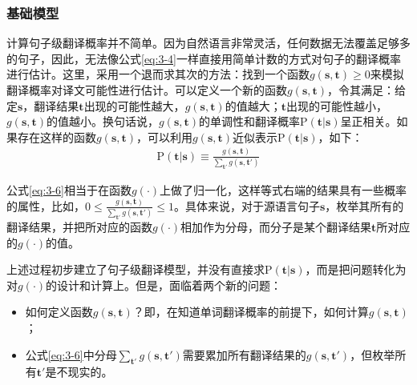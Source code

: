 
\subsubsection{基础模型}

\parinterval 计算句子级翻译概率并不简单。因为自然语言非常灵活，任何数据无法覆盖足够多的句子，因此，无法像公式\ref{eq:3-4}一样直接用简单计数的方式对句子的翻译概率进行估计。这里，采用一个退而求其次的方法：找到一个函数$g(\mathbf{s},\mathbf{t})\ge 0$来模拟翻译概率对译文可能性进行估计。可以定义一个新的函数$g(\mathbf{s},\mathbf{t})$，令其满足：给定$\mathbf{s}$，翻译结果$\mathbf{t}$出现的可能性越大，$g(\mathbf{s},\mathbf{t})$的值越大；$\mathbf{t}$出现的可能性越小，$g(\mathbf{s},\mathbf{t})$的值越小。换句话说，$g(\mathbf{s},\mathbf{t})$的单调性和翻译概率$\textrm{P}(\mathbf{t}|\mathbf{s})$呈正相关。如果存在这样的函数$g(\mathbf{s},\mathbf{t}
)$，可以利用$g(\mathbf{s},\mathbf{t})$近似表示$\textrm{P}(\mathbf{t}|\mathbf{s})$，如下：
\begin{eqnarray}
\textrm{P}(\mathbf{t}|\mathbf{s})  \equiv  \frac{g(\mathbf{s},\mathbf{t})}{\sum_{\mathbf{t}'}g(\mathbf{s},\mathbf{t}')}
\label{eq:3-6}
\end{eqnarray}

\parinterval 公式\ref{eq:3-6}相当于在函数$g(\cdot)$上做了归一化，这样等式右端的结果具有一些概率的属性，比如，$0 \le \frac{g(\mathbf{s},\mathbf{t})}{\sum_{\mathbf{t'}}g(\mathbf{s},\mathbf{t'})} \le 1$。具体来说，对于源语言句子$\mathbf{s}$，枚举其所有的翻译结果，并把所对应的函数$g(\cdot)$相加作为分母，而分子是某个翻译结果$\mathbf{t}$所对应的$g(\cdot)$的值。

\parinterval 上述过程初步建立了句子级翻译模型，并没有直接求$\textrm{P}(\mathbf{t}|\mathbf{s})$，而是把问题转化为对$g(\cdot)$的设计和计算上。但是，面临着两个新的问题：

\begin{itemize}
\vspace{0.5em}
\item 如何定义函数$g(\mathbf{s},\mathbf{t})$？即，在知道单词翻译概率的前提下，如何计算$g(\mathbf{s},\mathbf{t})$；
\vspace{0.5em}
\item 公式\ref{eq:3-6}中分母$\sum_{\mathbf{t'}}g(\mathbf{s},{\mathbf{t}'})$需要累加所有翻译结果的$g(\mathbf{s},{\mathbf{t}'})$，但枚举所有${\mathbf{t}'}$是不现实的。
\vspace{0.5em}
\end{itemize}

